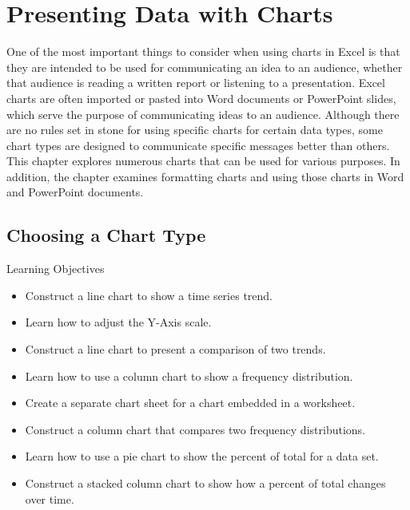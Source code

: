 \chapter{Presenting Data with Charts}\label{ch04:charts}

One of the most important things to consider when using charts in Excel is that they are intended to be used for communicating an idea to an audience, whether that audience is reading a written report or listening to a presentation. Excel charts are often imported or pasted into Word documents or PowerPoint slides, which serve the purpose of communicating ideas to an audience. Although there are no rules set in stone for using specific charts for certain data types, some chart types are designed to communicate specific messages better than others. This chapter explores numerous charts that can be used for various purposes. In addition, the chapter examines formatting charts and using those charts in Word and PowerPoint documents.

\section{Choosing a Chart Type}

\begin{center}
	\begin{objbox}{Learning Objectives}
		\begin{itemize}
			\setlength{\itemsep}{0pt}
			\setlength{\parskip}{0pt}
			\setlength{\parsep}{0pt}

			\item Construct a line chart to show a time series trend.
			\item Learn how to adjust the Y-Axis scale.
			\item Construct a line chart to present a comparison of two trends.
			\item Learn how to use a column chart to show a frequency distribution.
			\item Create a separate chart sheet for a chart embedded in a worksheet.
			\item Construct a column chart that compares two frequency distributions.
			\item Learn how to use a pie chart to show the percent of total for a data set.
			\item Construct a stacked column chart to show how a percent of total changes over time.
			
		\end{itemize}
	\end{objbox}
\end{center}

